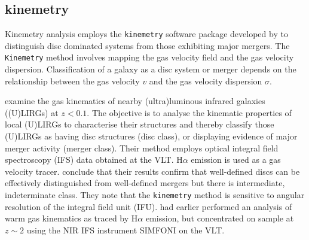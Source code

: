 
\subsection{kinemetry}
Kinemetry analysis employs the \texttt{kinemetry} software package developed by \citet{2006MNRAS.366..787K} to distinguish disc dominated systems from those exhibiting major mergers. The \texttt{Kinemetry} method involves mapping the gas velocity field and the gas velocity dispersion. Classification of a galaxy as a disc system or merger depends on the relationship between the gas velocity $v$ and the gas velocity dispersion $\sigma$.

\citet{2016A&A...591A..85B} examine the gas kinematics of nearby (ultra)luminous infrared galaxies ((U)LIRGs) at $z<0.1$. The objective is to analyse the kinematic properties of local (U)LIRGs to characterise their structures and thereby classify those (U)LIRGs as having disc structures (disc class), or displaying evidence of major merger activity (merger class). Their method employs optical integral field spectroscopy (IFS) data obtained at the VLT. H$\alpha$ emission is used as a gas velocity tracer. \citet{2016A&A...591A..85B} conclude that their results confirm that well-defined discs can be effectively distinguished from well-defined mergers but there is intermediate, indeterminate class. They note that the \texttt{kinemetry} method is sensitive to angular resolution of the integral field unit (IFU). \citet{2008ApJ...682..231S} had earlier performed an  analysis of warm gas kinematics as traced by H$\alpha$ emission, but concentrated on sample at $z\sim2$ using the NIR IFS instrument SIMFONI on the VLT. 
